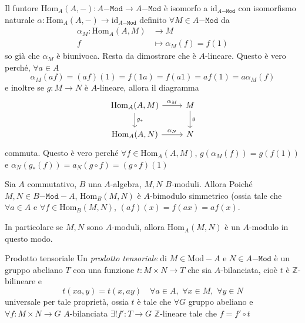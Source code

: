 \begin{example}{}
    Il funtore \(\mathrm{Hom}_A{(A, -)} : A\mathtt{-Mod} \to A\mathtt{-Mod}\) è
    isomorfo a \(\mathrm{id}_{A\mathtt{-Mod}} \) con isomorfismo naturale
    \(\alpha : \mathrm{Hom}_A{(A, -)} \to \mathrm{id}_{A\mathtt{-Mod}} \)
    definito \(\forall M \in A\mathtt{-Mod}\) da
    \begin{align*}
        \alpha_M: \mathrm{Hom}_A{(A, M)} &\longrightarrow M \\
        f &\longmapsto \alpha_M(f) = f{(1)}
    \end{align*}
    so già che \(\alpha_M\) è biunivoca. Resta da dimostrare che è
    \(A\)-lineare. Questo è vero perché, \(\forall a \in A\) 
    \[
      \alpha_M {(af)} = {(af)}{(1)} = f{(1a)} = f{(a1)} = af{(1)} = a\alpha_M {(f)}
    \]
    e inoltre se \(g : M \to N\) è \(A\)-lineare, allora il diagramma
    \[\begin{tikzcd}
	\mathrm{Hom}_A{(A, M)} & M \\
	\mathrm{Hom}_A{(A, N)} & N
	\arrow["{\alpha_M}", from=1-1, to=1-2]
	\arrow["{g_*}", from=1-1, to=2-1]
	\arrow["g", from=1-2, to=2-2]
	\arrow["{\alpha_N}", from=2-1, to=2-2]
\end{tikzcd} \]
    commuta.
    Questo è vero perché \(\forall f \in \mathrm{Hom}_A{(A, M)}\),
    \(g{(\alpha_M{(f)})} = g {(f{(1)})}\) e \(\alpha_N{(g_*{(f)})} = a_N{(g
    \circ f)} = {(g \circ f)}{(1)}\) 
\end{example}

\begin{example}{}
    Sia \(A\) commutativo, \(B\) una \(A\)-algebra, \(M, N\) \(B\)-moduli.
    Allora Poiché \(M, N \in B\mathtt{-Mod-}A\), \(\mathrm{Hom}_B{(M, N)}\) è
    \(A\)-bimodulo simmetrico (ossia tale che \(\forall a \in A\) e \(\forall f
    \in \mathrm{Hom}_B{(M, N)}\), \({(af)}{(x)} = f{(ax)} = af{(x)}\).

    In particolare se \(M, N\) sono \(A\)-moduli, allora \(\mathrm{Hom}_A{(M,
    N)}\) è un \(A\)-modulo in questo modo.
\end{example}


\begin{definition}{Prodotto tensoriale}
    Un \emph{prodotto tensoriale} di \(M \in \mathrm{Mod-}A\) e \(N \in
    A\mathtt{-Mod}\) è un gruppo abeliano \(T\) con una funzione \(t: M \times N
    \to T\) che sia \(A\)-bilanciata, cioè \(t\) è \(\mathbb{Z}\)-bilineare e
    \[
      t{(xa, y)} = t{(x, ay)} \quad \forall a \in A,\,\, \forall x \in M,\,\,
      \forall y \in N
    \]
    universale per tale proprietà, ossia \(t\) è
    tale che \(\forall G\) gruppo abeliano e \(\forall f: M \times N \to G\)
    \(A\)-bilanciata \(\exists ! f' : T \to G\) \(\mathbb{Z}\)-lineare tale che
    \(f = f' \circ t\) 
\end{definition}

